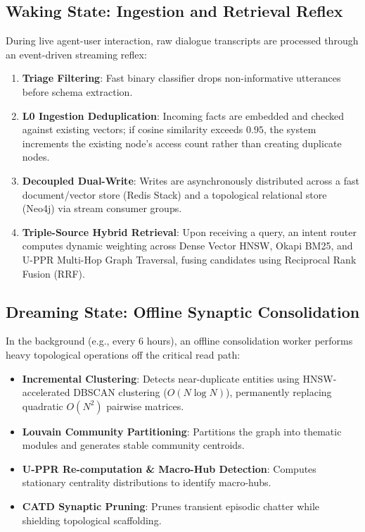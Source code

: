 \documentclass[conference]{IEEEtran}
\begin{document}
\subsection{Waking State: Ingestion and Retrieval Reflex}
During live agent-user interaction, raw dialogue transcripts are processed through an event-driven streaming reflex:
\begin{enumerate}
    \item \textbf{Triage Filtering}: Fast binary classifier drops non-informative utterances before schema extraction.
    \item \textbf{L0 Ingestion Deduplication}: Incoming facts are embedded and checked against existing vectors; if cosine similarity exceeds $0.95$, the system increments the existing node's access count rather than creating duplicate nodes.
    \item \textbf{Decoupled Dual-Write}: Writes are asynchronously distributed across a fast document/vector store (Redis Stack) and a topological relational store (Neo4j) via stream consumer groups.
    \item \textbf{Triple-Source Hybrid Retrieval}: Upon receiving a query, an intent router computes dynamic weighting across Dense Vector HNSW, Okapi BM25, and U-PPR Multi-Hop Graph Traversal, fusing candidates using Reciprocal Rank Fusion (RRF).
\end{enumerate}

\subsection{Dreaming State: Offline Synaptic Consolidation}
In the background (e.g., every 6 hours), an offline consolidation worker performs heavy topological operations off the critical read path:
\begin{itemize}
    \item \textbf{Incremental Clustering}: Detects near-duplicate entities using HNSW-accelerated DBSCAN clustering ($O(N \log N)$), permanently replacing quadratic $O(N^2)$ pairwise matrices.
    \item \textbf{Louvain Community Partitioning}: Partitions the graph into thematic modules and generates stable community centroids.
    \item \textbf{U-PPR Re-computation \& Macro-Hub Detection}: Computes stationary centrality distributions to identify macro-hubs.
    \item \textbf{CATD Synaptic Pruning}: Prunes transient episodic chatter while shielding topological scaffolding.
\end{itemize}
\end{document}
